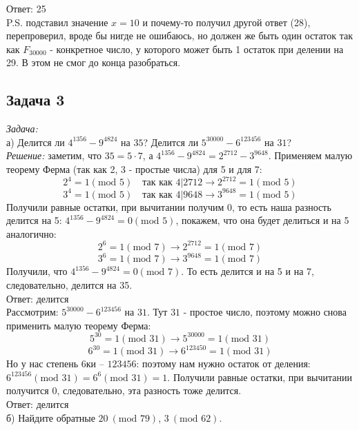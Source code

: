 \documentclass[a4paper,12pt]{article} %
\begin{document}
Ответ: 25\\
P.S. подставил значение $ x = 10 $ и почему-то получил другой ответ (28), перепроверил, вроде бы нигде не ошибаюсь, но должен же быть один остаток так как $F_{30000}$ - конкретное число, у которого может быть 1 остаток при делении на 29. В этом не смог до конца разобраться. 


\subsection*{Задача 3}
\textit{Задача:}\\

а) Делится ли $4^{1356}-9^{4824}$ на $35$? Делится ли $5^{30000} - 6^{123456}$ на $31$?\\

\textit{Решение:} заметим, что $ 35 = 5 \cdot 7 $, а $ 4^{1356}-9^{4824} = 2^{2712} - 3^{9648} $. Применяем малую теорему Ферма (так как 2, 3 - простые числа) для 5 и для 7:\\
$$
2^4 = 1 (\mbox{mod } 5) \quad \text{так как } 4|2712 \rightarrow 2^{2712} = 1 (\mbox{mod } 5)
$$
$$
3^4 = 1 (\mbox{mod } 5) \quad \text{так как } 4|9648 \rightarrow 3^{9648} = 1 (\mbox{mod } 5)
$$
Получили равные остатки, при вычитании получим 0, то есть наша разность делится на 5: $ 4^{1356}-9^{4824} = 0 (\mbox{mod } 5) $, покажем, что она будет делиться и на 5 аналогично:
$$
2^6 = 1 (\mbox{mod } 7) \rightarrow 2^{2712} = 1 (\mbox{mod } 7)
$$
$$
3^6 = 1 (\mbox{mod } 7) \rightarrow 3^{9648} = 1 (\mbox{mod } 7)
$$
Получили, что $ 4^{1356}-9^{4824} = 0 (\mbox{mod } 7) $. То есть делится и на 5 и на 7, следовательно, делится на 35.\\

Ответ: делится\\

Рассмотрим: $5^{30000} - 6^{123456}$ на $31$. Тут $31$ - простое число, поэтому можно снова применить малую теорему Ферма:\\
$$
5^{30} = 1 (\mbox{mod } 31) \rightarrow 5^{30000} = 1 (\mbox{mod } 31)
$$
$$
6^{30} = 1 (\mbox{mod } 31) \rightarrow 6^{123450} = 1 (\mbox{mod } 31)
$$
Но у нас степень 6ки -- $ 123456 $: поэтому нам нужно остаток от деления: $ 6^{123456} (\mbox{mod } 31) = 6^6 (\mbox{mod } 31) = 1 $.
Получили равные остатки, при вычитании получится 0, следовательно, эта разность тоже делится.\\

Ответ: делится \\

б) Найдите обратные $20 \ (\mbox{mod } 79)$, $3 \ (\mbox{mod } 62)$.\\
\end{document}
